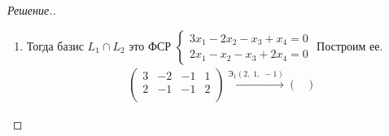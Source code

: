 \documentclass[a4paper]{article}
\theoremstyle{remark}
\newcommand{\eq}[1]{\begin{cases} #1 \end{cases}}
\newcommand{\arron}[3]{%
  \ensuremath{\xrightarrow{\text{Э}_1(#1,\; #2,\; #3)}}%
}
\newcommand{\arrth}[2]{%
  \ensuremath{\xrightarrow{\text{Э}_3(#1,\; #2)}}%
}
\begin{document}
\begin{proof}[Решение.]
\begin{enumerate}
\begin{multline*}
                    \arron{2}{3}{-2}
                    \begin{pmatrix}
                        1 & 0 & 0 & -3 \\
                        0 & 1 & -1 & 1 \\
                        0 & 0 & 5 & 5 \\
                    \end{pmatrix}
                    \arrth{3}{\nicefrac15}
                    \begin{pmatrix}
                        1 & 0 & 0 & -3 \\
                        0 & 1 & -1 & 1 \\
                        0 & 0 & 1 & 1 \\
                    \end{pmatrix}
                    \arron{3}{2}{1}
                    \begin{pmatrix}
                        1 & 0 & 0 & -3 \\
                        0 & 1 & 0 & 2 \\
                        0 & 0 & 1 & 1 \\
                    \end{pmatrix}
                \end{multline*}
                Получаем ФСР: $
                \begin{pmatrix}
                    3\\
                    -2\\
                    -1\\
                    1
                \end{pmatrix}
                \Rightarrow L_2 \colon \eq{3x_1 - 2x_2 - x_3 + x_4 = 0}$
                \item Тогда базис $L_1 \cap L_2$ это ФСР 
                $\eq{
                    3x_1 - 2x_2 - x_3 + x_4 = 0 \\
                    2x_1 - x_2 - x_3 + 2x_4 = 0
                }$
                Построим ее. 
                \begin{multline*}
                    \begin{pmatrix}
                        3 & -2 & -1 & 1 \\
                        2 & -1 & -1 & 2 \\
                    \end{pmatrix} 
                    \arron{2}{1}{-1}
                    \begin{pmatrix}

\end{pmatrix}
\end{multline*}
\end{enumerate}
\end{proof}
\end{document}
